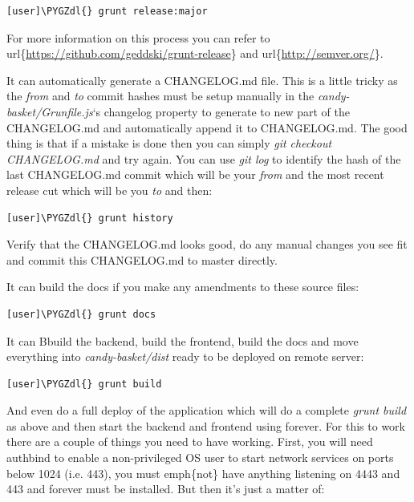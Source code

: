 \documentclass[letterpaper,10pt,english]{sphinxmanual}
\def\PYGZdl{\char`\$}
\begin{document}
\begin{Verbatim}[commandchars=\\\{\}]
[user]\PYGZdl{} grunt release:major
\end{Verbatim}

For more information on this process you can refer to
url\{\href{https://github.com/geddski/grunt-release}{https://github.com/geddski/grunt-release}\} and
url\{\href{http://semver.org/}{http://semver.org/}\}.

It can automatically generate a CHANGELOG.md file. This is a little
tricky as the \emph{from} and \emph{to} commit hashes must be setup manually in
the \emph{candy-basket/Grunfile.js}`s changelog property to generate to new
part of the CHANGELOG.md and automatically append it to
CHANGELOG.md. The good thing is that if a mistake is done then you can
simply \emph{git checkout CHANGELOG.md} and try again. You can use \emph{git
log} to identify the hash of the last CHANGELOG.md commit which will
be your \emph{from} and the most recent release cut which will be you \emph{to}
and then:

\begin{Verbatim}[commandchars=\\\{\}]
[user]\PYGZdl{} grunt history
\end{Verbatim}

Verify that the CHANGELOG.md looks good, do any manual changes you see
fit and commit this CHANGELOG.md to master directly.

It can build the docs if you make any amendments to these source
files:

\begin{Verbatim}[commandchars=\\\{\}]
[user]\PYGZdl{} grunt docs
\end{Verbatim}

It can Bbuild the backend, build the frontend, build the docs and move
everything into \emph{candy-basket/dist} ready to be deployed on remote
server:

\begin{Verbatim}[commandchars=\\\{\}]
[user]\PYGZdl{} grunt build
\end{Verbatim}

And even do a full deploy of the application which will do a complete
\emph{grunt build} as above and then start the backend and frontend using
forever. For this to work there are a couple of things you need to
have working. First, you will need authbind to enable a non-privileged
OS user to start network services on ports below 1024 (i.e. 443), you
must emph\{not\} have anything listening on 4443 and 443 and forever
must be installed. But then it's just a matter of:
\end{document}
